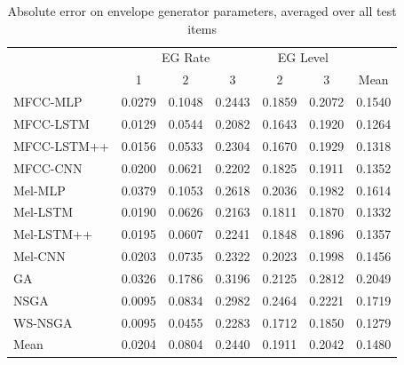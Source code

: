 
\begin{table}[ht]
\centering
\begin{tabular}{l|ccc|cc|c}
\toprule
{} & \multicolumn{3}{c}{EG Rate} & \multicolumn{2}{c}{EG Level} & {} \\
{} & 1 & 2 & 3 & 2 & 3 & Mean \\
\midrule
MFCC-MLP    &     0.0279 &     0.1048 &     0.2443 &      0.1859 &      0.2072 &   0.1540 \\
MFCC-LSTM   &     0.0129 &     0.0544 &     0.2082 &      0.1643 &      0.1920 &   0.1264 \\
MFCC-LSTM++ &     0.0156 &     0.0533 &     0.2304 &      0.1670 &      0.1929 &   0.1318 \\
MFCC-CNN    &     0.0200 &     0.0621 &     0.2202 &      0.1825 &      0.1911 &   0.1352 \\
\midrule
Mel-MLP     &     0.0379 &     0.1053 &     0.2618 &      0.2036 &      0.1982 &   0.1614 \\
Mel-LSTM    &     0.0190 &     0.0626 &     0.2163 &      0.1811 &      0.1870 &   0.1332 \\
Mel-LSTM++  &     0.0195 &     0.0607 &     0.2241 &      0.1848 &      0.1896 &   0.1357 \\
Mel-CNN     &     0.0203 &     0.0735 &     0.2322 &      0.2023 &      0.1998 &   0.1456 \\
\midrule
GA          &     0.0326 &     0.1786 &     0.3196 &      0.2125 &      0.2812 &   0.2049 \\
NSGA        &     0.0095 &     0.0834 &     0.2982 &      0.2464 &      0.2221 &   0.1719 \\
WS-NSGA     &     0.0095 &     0.0455 &     0.2283 &      0.1712 &      0.1850 &   0.1279 \\
\midrule
Mean        &     0.0204 &     0.0804 &     0.2440 &      0.1911 &      0.2042 &   0.1480 \\
\bottomrule
\end{tabular}
\caption{Absolute error on envelope generator parameters, averaged over all test items}
\label{tbl:param_eval_eg}
\end{table}

